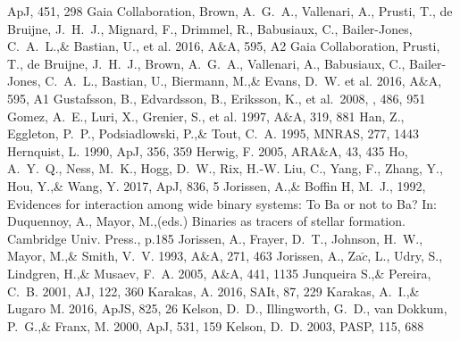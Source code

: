 \documentclass[a4paper,fleqn,usenatbib]{mnras}
\begin{document}
\begin{thebibliography}{99}
ApJ, 451, 298
Gaia Collaboration, Brown, A.~G.~A., Vallenari, A., Prusti, T., de Bruijne, J.~H.~J., Mignard, F., Drimmel, R., Babusiaux, C., Bailer-Jones, C.~A.~L.,\& Bastian, U., et al. 2016, 
A$\&$A, 595, A2
Gaia Collaboration, Prusti, T., de Bruijne, J.~H.~J., Brown, A.~G.~A., Vallenari, A., Babusiaux, C., Bailer-Jones, C.~A.~L., Bastian, U., Biermann, M.,\& Evans, D.~W. et al. 2016, 
A$\&$A, 595, A1
 Gustafsson, B., Edvardsson, B., Eriksson, K., et al.\ 2008, \aap, 486, 951 
Gomez, A.~E., Luri, X., Grenier, S., et al. 1997, 
A$\&$A, 319, 881
Han, Z., Eggleton, P.~P., Podsiadlowski, P.,\& Tout, C.~A. 1995, 
MNRAS, 277, 1443
Hernquist, L. 1990, 
ApJ, 356, 359
Herwig, F. 2005, 
ARA$\&$A, 43, 435
Ho, A.~Y.~Q., Ness, M.~K., Hogg, D.~W., Rix, H.-W. Liu, C., Yang, F., Zhang, Y., Hou, Y.,\& Wang, Y. 2017, 
ApJ, 836, 5
Jorissen, A.,\& Boffin H, M.~J., 1992, 
Evidences for interaction among wide binary systems: To Ba or not to Ba? In: Duquennoy, A., Mayor, M.,(eds.) Binaries as tracers of stellar formation. Cambridge Univ. Press., p.185
Jorissen, A., Frayer, D.~T., Johnson, H.~W., Mayor, M.,\& Smith, V.~V. 1993, 
A$\&$A, 271, 463
Jorissen, A., Za$\check{c}$, L., Udry, S., Lindgren, H.,\& Musaev, F.~A. 2005, 
A$\&$A, 441, 1135
Junqueira S.,\& Pereira, C.~B. 2001, 
AJ, 122, 360
Karakas, A. 2016, 
SAIt, 87, 229
Karakas, A.~I.,\& Lugaro M. 2016, 
ApJS, 825, 26
Kelson, D.~D., Illingworth, G.~D., van Dokkum, P.~G.,\& Franx, M. 2000, ApJ, 531, 159
Kelson, D.~D. 2003, 
PASP, 115, 688

\end{thebibliography}
\end{document}

